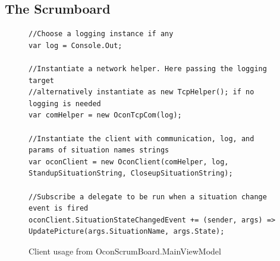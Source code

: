\documentclass[../report.tex]{subfiles}
\begin{document}
\subsection{The Scrumboard}

\begin{figure}[H]
\begin{lstlisting}
//Choose a logging instance if any
var log = Console.Out;

//Instantiate a network helper. Here passing the logging target
//alternatively instantiate as new TcpHelper(); if no logging is needed
var comHelper = new OconTcpCom(log);

//Instantiate the client with communication, log, and params of situation names strings
var oconClient = new OconClient(comHelper, log, StandupSituationString, CloseupSituationString);

//Subscribe a delegate to be run when a situation change event is fired
oconClient.SituationStateChangedEvent += (sender, args) => UpdatePicture(args.SituationName, args.State);
\end{lstlisting}
\caption{Client usage from OconScrumBoard.MainViewModel}
\label{code:OconClient}
\end{figure}


\end{document}
